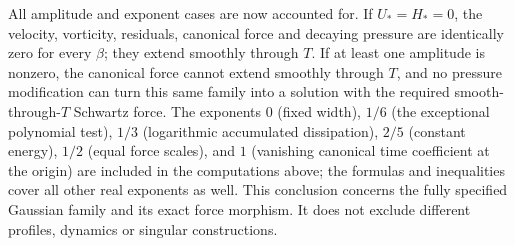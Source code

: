 All amplitude and exponent cases are now accounted for.  If
\(U_*=H_*=0\), the velocity, vorticity, residuals, canonical force and
decaying pressure are identically zero for every \(\beta\); they
extend smoothly through \(T\).  If at least one amplitude is nonzero,
the canonical force cannot extend smoothly through \(T\), and no
pressure modification can turn this same family into a solution with
the required smooth-through-\(T\) Schwartz force.  The exponents
\(0\) (fixed width), \(1/6\) (the exceptional polynomial test),
\(1/3\) (logarithmic accumulated dissipation), \(2/5\) (constant energy),
\(1/2\) (equal force scales), and \(1\) (vanishing canonical time
coefficient at the origin) are included in the computations above;
the formulas and inequalities cover all other real exponents as well.
This conclusion concerns the fully specified Gaussian family and its
exact force morphism.  It does not exclude different profiles, dynamics
or singular constructions.

